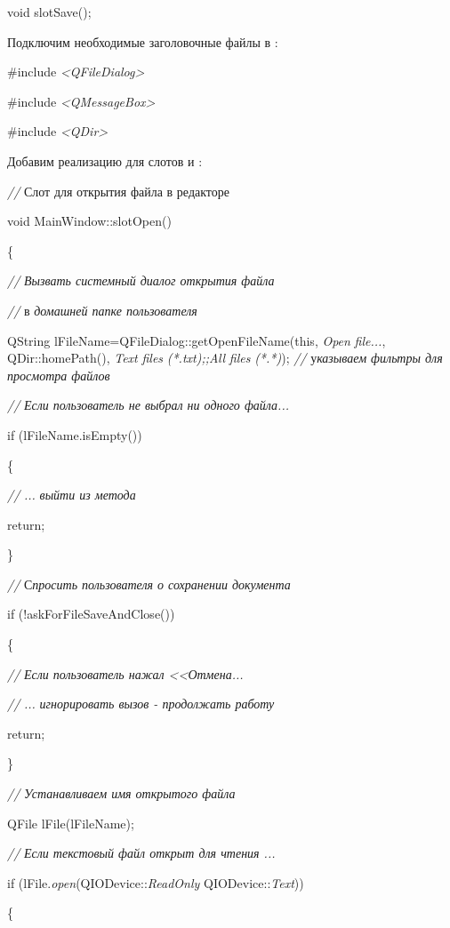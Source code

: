 void slotSave();

Подключим необходимые заголовочные файлы в : 

\#include \textit{{<}QFileDialog{>}}

\#include \textit{{<}QMessageBox{>}}

\#include \textit{{<}QDir{>}}

Добавим реализацию для слотов  и : 

\textit{// }Слот для открытия файла в редакторе 

void MainWindow::slotOpen()

\{

\textit{//} \textit{Вызвать системный диалог открытия файла}

\textit{//} в\textit{ домашней папке пользователя}\textit{ }

QString lFileName=QFileDialog::getOpenFileName(this, \textit{Open} \textit{file...}, QDir::homePath(),
\textit{Text} \textit{files} \textit{(*.txt);;All} \textit{files} \textit{(*.*)}); \textit{//}
у\textit{казываем фильтры для просмотра файлов}\textit{ }

\textit{//} \textit{Если пользователь не выбрал ни одного файла...}

if (lFileName.isEmpty())

 \{

 \textit{//} \textit{...} \textit{выйти из метода}\textit{ }

 return;

\}

\textit{//} С\textit{просить пользователя о сохранении документа}\textit{ }

if (!askForFileSaveAndClose())

\{

\textit{//} \textit{Если пользователь нажал <<Отмена...}\textit{ }

\textit{//} \textit{...} \textit{игнорировать вызов - продолжать работу}\textit{ }

 return;

\}

\textit{//} \textit{Устанавливаем имя открытого файла}\textit{ }

QFile lFile(lFileName);

\textit{//} \textit{Если текстовый файл открыт для чтения ...}\textit{ }

if (lFile.\textit{open}(QIODevice::\textit{ReadOnly} {\textbar} QIODevice::\textit{Text}))

\{

